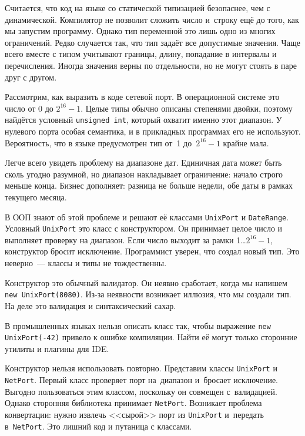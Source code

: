 
Считается, что код на языке со статической типизацией безопаснее, чем с
динамической. Компилятор не позволит сложить число и~строку ещё до того, как
мы запустим программу. Однако тип переменной это лишь одно из многих
ограничений. Редко случается так, что тип задаёт все допустимые
значения. Чаще всего вместе с типом учитывают границы, длину, попадание в
интервалы и перечисления. Иногда значения верны по отдельности, но не могут
стоять в паре друг с другом.


Рассмотрим, как выразить в коде сетевой порт. В операционной системе это число
от 0 до $2^{16}-1$. Целые типы обычно описаны степенями двойки, поэтому
найдётся условный \verb|unsigned int|, который охватит именно этот
диапазон. У нулевого порта особая семантика, и в прикладных программах его не
используют. Вероятность, что в языке предусмотрен тип от~1 до~$2^{16}-1$ крайне
мала.

Легче всего увидеть проблему на диапазоне дат. Единичная дата может быть сколь
угодно разумной, но диапазон накладывает ограничение: начало строго меньше
конца. Бизнес дополняет: разница не больше недели, обе даты в рамках текущего
месяца.


В ООП знают об этой проблеме и решают её классами \verb|UnixPort| и
\verb|DateRange|. Условный \verb|UnixPort| это класс с конструктором. Он
принимает целое число и выполняет проверку на диапазон. Если число выходит за
рамки 1\dots$2^{16}-1$, конструктор бросит исключение. Программист уверен, что
создал новый тип. Это неверно~--- классы и типы не тождественны.

Конструктор это обычный валидатор. Он неявно сработает, когда мы напишем
\verb|new UnixPort(8080)|. Из-за неявности возникает иллюзия, что мы создали
тип. На деле это валидация и синтаксический сахар.


В промышленных языках нельзя описать класс так, чтобы выражение
\verb|new UnixPort(-42)| привело к ошибке компиляции. Найти её могут
только сторонние утилиты и плагины для IDE.

Конструктор нельзя использовать повторно. Представим классы \verb|UnixPort| и
\verb|NetPort|. Первый класс проверяет порт на~диапазон и~бросает
исключение. Выгодно пользоваться этим классом, поскольку он совмещен
с~валидацией. Однако сторонняя библиотека принимает \verb|NetPort|. Возникает
проблема конвертации: нужно извлечь <<сырой>> порт из \verb|UnixPort|
и~передать в~\verb|NetPort|. Это лишний код и путаница с классами.

